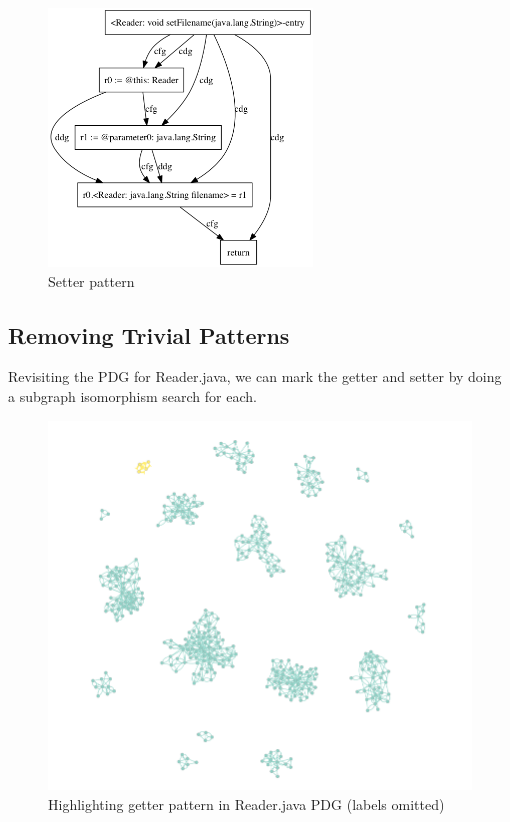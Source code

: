 \documentclass[12pt]{article}
\begin{document}
\begin{figure}[H]
\centerline{
\includegraphics[width=7cm]{patterns/reader_setter.png}
}
\caption{\label{reader_setter}
    Setter pattern
}
\end{figure}

\subsection{Removing Trivial Patterns}
Revisiting the PDG for Reader.java, we can mark the getter and setter by doing a subgraph isomorphism search for each.

\begin{figure}[H]
\centerline{
\includegraphics[width=\linewidth]{patterns/reader_getter_isomorphism.png}
}
\caption{\label{reader_getter_isomorphism}
    Highlighting getter pattern in Reader.java PDG (labels omitted)
}
\end{figure}
\end{document}
